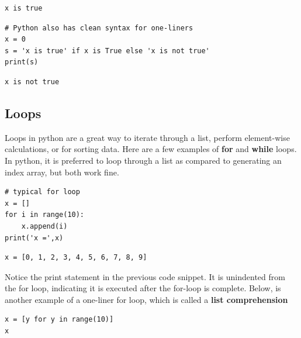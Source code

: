 \documentclass[%
oneside,                 %
final,                   %
10pt]{article}
\begin{document}
\begin{verbatim}
x is true
\end{verbatim}

\begin{verbatim}
# Python also has clean syntax for one-liners
x = 0
s = 'x is true' if x is True else 'x is not true'
print(s)
\end{verbatim}

\begin{verbatim}
x is not true
\end{verbatim}

\subsection{Loops}

Loops in python are a great way to iterate through a list, perform element-wise calculations, or for sorting data. Here are a few examples of  \textbf{for} and \textbf{while} loops. In python, it is preferred to loop through a list as compared to generating an index array, but both work fine.

\begin{verbatim}
# typical for loop
x = []
for i in range(10):
    x.append(i)
print('x =',x)
\end{verbatim}


\begin{verbatim}
x = [0, 1, 2, 3, 4, 5, 6, 7, 8, 9]
\end{verbatim}

Notice the print statement in the previous code snippet. It is unindented from the for loop, indicating it is executed after the for-loop is complete. Below, is another example of a one-liner for loop, which is called a \textbf{list comprehension}
\begin{verbatim}
x = [y for y in range(10)]
x
\end{verbatim}
\end{document}
